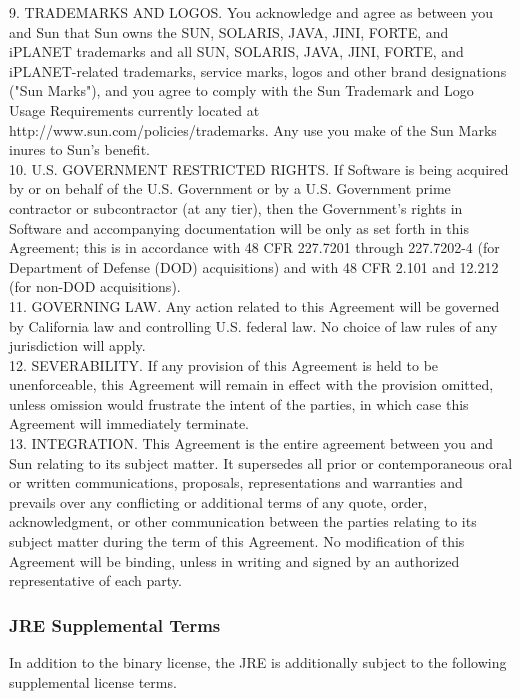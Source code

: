 {   9. TRADEMARKS AND LOGOS. You acknowledge and agree as between you
   and Sun that Sun owns the SUN, SOLARIS, JAVA, JINI, FORTE, and
   iPLANET trademarks and all SUN, SOLARIS, JAVA, JINI, FORTE, and
   iPLANET-related trademarks, service marks, logos and other brand
   designations ("Sun Marks"), and you agree to comply with the Sun
   Trademark and Logo Usage Requirements currently located at
   http://www.sun.com/policies/trademarks. Any use you make of the Sun
   Marks inures to Sun's benefit.
\\[4pt]
  10. U.S. GOVERNMENT RESTRICTED RIGHTS. If Software is being acquired
  by or on behalf of the U.S. Government or by a U.S. Government prime
  contractor or subcontractor (at any tier), then the Government's
  rights in Software and accompanying documentation will be only as
  set forth in this Agreement; this is in accordance with 48 CFR
  227.7201 through 227.7202-4 (for Department of Defense (DOD)
  acquisitions) and with 48 CFR 2.101 and 12.212 (for non-DOD
  acquisitions).
\\[4pt]
  11. GOVERNING LAW. Any action related to this Agreement will be
  governed by California law and controlling U.S. federal law. No
  choice of law rules of any jurisdiction will apply.
\\[4pt]
  12. SEVERABILITY. If any provision of this Agreement is held to be
  unenforceable, this Agreement will remain in effect with the
  provision omitted, unless omission would frustrate the intent of the
  parties, in which case this Agreement will immediately terminate.
\\[4pt]
  13. INTEGRATION. This Agreement is the entire agreement between you
  and Sun relating to its subject matter. It supersedes all prior or
  contemporaneous oral or written communications, proposals,
  representations and warranties and prevails over any conflicting or
  additional terms of any quote, order, acknowledgment, or other
  communication between the parties relating to its subject matter
  during the term of this Agreement. No modification of this Agreement
  will be binding, unless in writing and signed by an authorized
  representative of each party.
}

\subsubsection{JRE Supplemental Terms}

\setlength{\baselineskip}{\oldbaselineskip}
\noindent
In addition to the binary license, the JRE is additionally subject to
the following supplemental license terms.
\\

